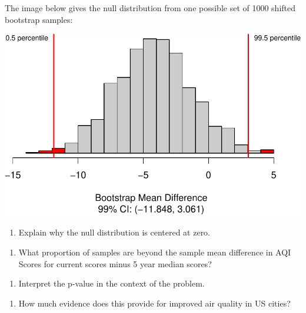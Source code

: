 \documentclass[
]{report}
\providecommand{\tightlist}{%
  \setlength{\itemsep}{0pt}\setlength{\parskip}{0pt}}
\begin{document}
\vspace{.7in}

The image below gives the null distribution from one possible set of 1000 shifted bootstrap samples:

\begin{center}\includegraphics[width=0.7\linewidth]{08-paired_files/figure-latex/unnamed-chunk-5-1} \end{center}

\begin{enumerate}
\def\labelenumi{\arabic{enumi}.}
\setcounter{enumi}{11}
\tightlist
\item
  Explain why the null distribution is centered at zero.
\end{enumerate}

\vspace{.5in}

\begin{enumerate}
\def\labelenumi{\arabic{enumi}.}
\setcounter{enumi}{12}
\tightlist
\item
  What proportion of samples are beyond the sample mean difference in AQI Scores for current scores minus 5 year median scores?
\end{enumerate}

\newpage

\begin{enumerate}
\def\labelenumi{\arabic{enumi}.}
\setcounter{enumi}{13}
\tightlist
\item
  Interpret the p-value in the context of the problem.
\end{enumerate}

\vspace{1in}

\begin{enumerate}
\def\labelenumi{\arabic{enumi}.}
\setcounter{enumi}{14}
\tightlist
\item
  How much evidence does this provide for improved air quality in US cities?
\end{enumerate}
\end{document}
